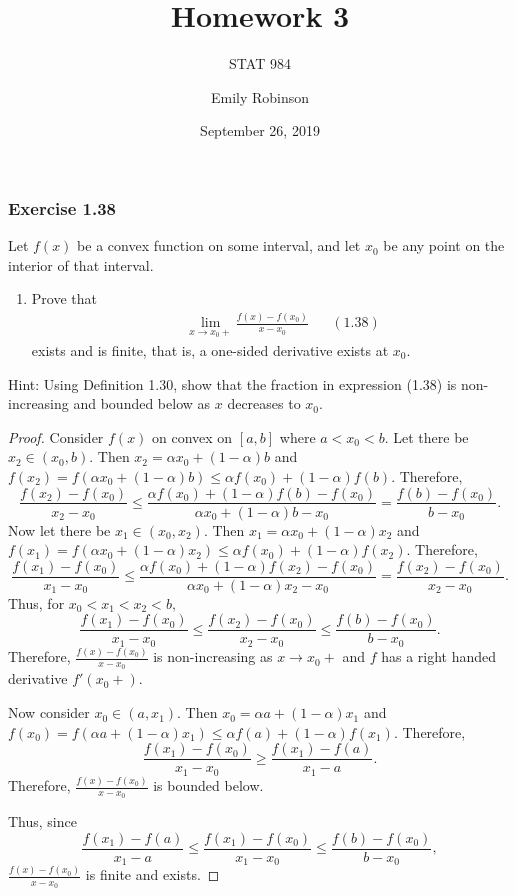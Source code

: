 \documentclass[12pt,]{article}
\title{Homework 3}
\subtitle{STAT 984}
\author{Emily Robinson}
\date{September 26, 2019}
\providecommand{\tightlist}{%
  \setlength{\itemsep}{0pt}\setlength{\parskip}{0pt}}
\begin{document}
\maketitle

\hypertarget{exercise-1.38}{%
\subsubsection{Exercise 1.38}\label{exercise-1.38}}

Let \(f(x)\) be a convex function on some interval, and let \(x_0\) be
any point on the interior of that interval.

\begin{enumerate}
\def\labelenumi{(\alph{enumi})}
\tightlist
\item
  Prove that \begin{align*}
  &&\lim_{x\rightarrow x_0+} \frac{f(x)-f(x_0)}{x-x_0} && (1.38)
  \end{align*} exists and is finite, that is, a one-sided derivative
  exists at \(x_0\).
\end{enumerate}

Hint: Using Definition 1.30, show that the fraction in expression (1.38)
is non-increasing and bounded below as \(x\) decreases to \(x_0.\)

\begin{proof}
Consider $f(x)$ on convex on $[a,b]$ where $a < x_0 < b.$ Let there be $x_2 \in (x_0, b).$ Then $x_2 = \alpha x_0 + (1-\alpha) b$ and $f(x_2) = f(\alpha x_0 + (1-\alpha) b) \le \alpha f(x_0) + (1-\alpha)f(b).$ Therefore, 
$$\frac{f(x_2)-f(x_0)}{x_2-x_0}\le\frac{\alpha f(x_0)+(1-\alpha)f(b)-f(x_0)}{\alpha x_0+(1-\alpha)b - x_0} = \frac{f(b) -f(x_0)}{b - x_0}.$$
Now let there be $x_1 \in (x_0, x_2).$ Then $x_1 = \alpha x_0 + (1-\alpha) x_2$ and $f(x_1) = f(\alpha x_0 + (1-\alpha) x_2) \le \alpha f(x_0) + (1-\alpha)f(x_2).$ Therefore, 
$$\frac{f(x_1)-f(x_0)}{x_1-x_0}\le\frac{\alpha f(x_0)+(1-\alpha)f(x_2)-f(x_0)}{\alpha x_0+(1-\alpha)x_2 - x_0} = \frac{f(x_2) -f(x_0)}{x_2 - x_0}.$$
Thus, for $x_0 < x_1 < x_2 < b,$
$$\frac{f(x_1)-f(x_0)}{x_1-x_0} \le \frac{f(x_2) -f(x_0)}{x_2 - x_0} \le \frac{f(b) -f(x_0)}{b - x_0}.$$
Therefore, $\frac{f(x) - f(x_0)}{x-x_0}$ is non-increasing as $x \rightarrow x_0+$ and $f$ has a right handed derivative $f'(x_0+)$.

Now consider $x_0 \in (a, x_1).$ Then $x_0 = \alpha a + (1-\alpha) x_1$ and $f(x_0) = f(\alpha a + (1-\alpha) x_1) \le \alpha f(a) + (1-\alpha)f(x_1).$ Therefore,
$$\frac{f(x_1) -f(x_0)}{x_1 - x_0}\ge \frac{f(x_1)-f(a)}{x_1-a}.$$
Therefore, $\frac{f(x) - f(x_0)}{x-x_0}$ is bounded below.

Thus, since $$\frac{f(x_1)-f(a)}{x_1-a}\le \frac{f(x_1) -f(x_0)}{x_1 - x_0} \le\frac{f(b) -f(x_0)}{b - x_0},$$ $\frac{f(x) - f(x_0)}{x-x_0}$ is finite and exists. 
\end{proof}
\end{document}
